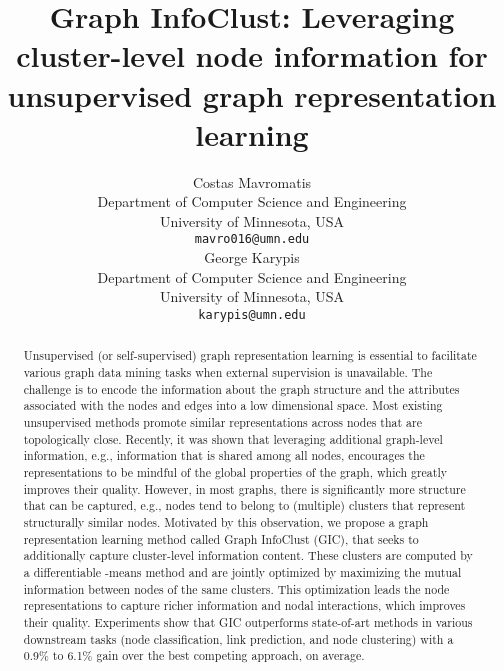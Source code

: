 \documentclass{article}
\begin{document}
\title{Graph InfoClust: Leveraging cluster-level node information for unsupervised graph representation learning}

\author{
  Costas Mavromatis \\
  Department of Computer Science and Engineering\\
  University of Minnesota, USA\\
  \texttt{mavro016@umn.edu} \\
\And
 George Karypis \\
  Department of Computer Science and Engineering\\
  University of Minnesota, USA\\
  \texttt{karypis@umn.edu} \\
}

\maketitle
\begin{abstract}
Unsupervised (or self-supervised) graph representation learning is essential to facilitate various graph data mining tasks when external supervision is unavailable. The challenge is to encode the information about the graph structure and the attributes associated with the nodes and edges into a low dimensional space.  
Most existing unsupervised methods promote similar representations across nodes that are topologically close. Recently, it was shown that leveraging additional graph-level information, e.g., information that is shared among all nodes, encourages the representations to be mindful of the global properties of the graph, which greatly improves their quality. However, in most graphs, there is significantly more structure that can be captured, e.g., nodes tend to belong to (multiple) clusters that represent structurally similar nodes. Motivated by this observation, we propose a graph representation learning method called Graph InfoClust (GIC), that seeks to additionally capture cluster-level information content. These clusters are computed by a differentiable -means method and are jointly optimized by maximizing the mutual information between nodes of the same clusters. This optimization leads the node representations to capture richer information and nodal interactions, which improves their quality. 
Experiments show that GIC outperforms state-of-art methods in various downstream tasks (node classification, link prediction, and node clustering) with a 0.9\% to 6.1\% gain over the best competing approach, on average.



\end{abstract}
\end{document}
